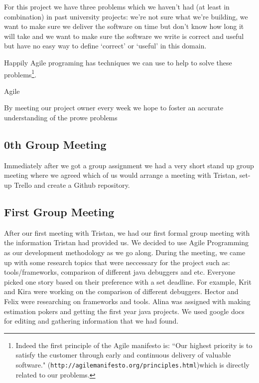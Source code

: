 \documentclass[11pt, a4paper]{article}
\begin{document}
For this project we have three problems which we haven't had (at least in combination) in past university projects: we're not sure what we're building, we want to make sure we deliver the software on time but don't know how long it will take and
we want to make sure the software we write is correct and useful but have no easy way to define `correct' or `useful' in this domain.

Happily Agile programing has techniques we can use to help to solve these problems\footnote{Indeed the first principle of the Agile manifesto is: ``Our highest priority is to satisfy the customer
through early and continuous delivery of valuable software." ({\tt http://agilemanifesto.org/principles.html})which is directly related to our problems.}.

Agile 

By meeting our project owner every week we hope to foster an accurate understanding of the prowe problems

\subsection{0th Group Meeting}
Immediately after we got a group assignment we had a very short stand up group meeting where we agreed which of us would arrange a meeting with Tristan, set-up Trello and create a Github repository.  

\subsection{First Group Meeting}
After our first meeting with Tristan, we had our first formal group meeting with the information Tristan had provided us. We decided to use Agile Programming as our development methodology as we go along. During the meeting, we came up with some research topics that were neccessary for the project such as: tools/frameworks, comparison of different java debuggers and etc. Everyone picked one story based on their preference with a set deadline. For example, Krit and Kira were working on the comparison of different debuggers. Hector and Felix were researching on frameworks and tools. Alina was assigned with making estimation pokers and getting the first year java projects. We used google docs for editing and gathering information that we had found. 
\end{document}
